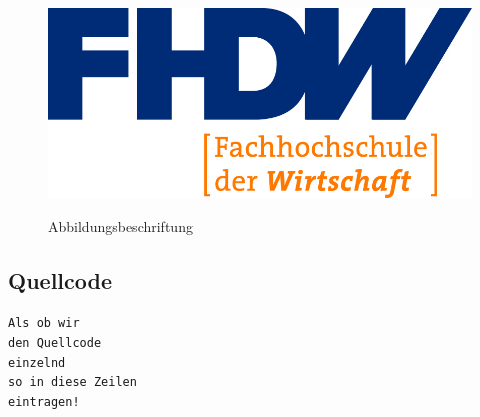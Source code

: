 \begin{figure}[H]
\centering
\begin{minipage}[t]{1\textwidth} %
\caption{Abbildungsbeschriftung} %
\includegraphics[width=1\textwidth]{img/fhdw}\\ %
\end{minipage}
\end{figure}

\subsection{Quellcode}

\texttt{Als ob wir}\\
\texttt{den Quellcode}\\
\texttt{einzelnd}\\
\texttt{so in diese Zeilen}\\
\texttt{eintragen!}\\
